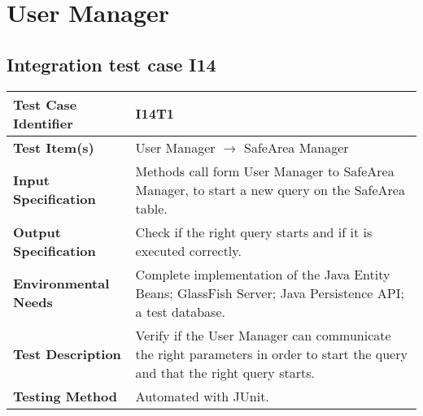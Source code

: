 \section{User Manager}
\subsection{Integration test case I14}

\begin{tabular}{l p{}}
    \hline
    \textbf{Test Case Identifier} & I14T1\\
    \hline
    \textbf{Test Item(s)} & User Manager $\rightarrow$ SafeArea Manager\\
    \hline
    \textbf{Input Specification} & Methods call form User Manager to SafeArea Manager, to start a new query on the SafeArea table.\\
    \hline
    \textbf{Output Specification} & Check if the right query starts and if it is executed correctly.\\
    \hline
    \textbf{Environmental Needs} & Complete implementation of the Java Entity Beans; GlassFish Server; Java Persistence API; a test database.\\
    \hline
    \textbf{Test Description} & Verify if the User Manager can communicate the right parameters in order to start the query and that the right query starts.\\
    \hline
    \textbf{Testing Method} & Automated with JUnit.\\
    \hline
\end{tabular}